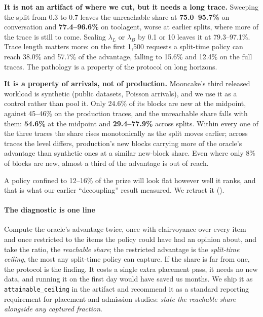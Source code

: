 \medskip
\noindent\textbf{It is not an artifact of where we cut, but it needs a long trace.} Sweeping the split
from 0.3 to 0.7 leaves the unreachable share at \textbf{75.0--95.7\%} on conversation and
\textbf{77.4--96.6\%} on toolagent, worse at earlier splits, where more of the trace is still to come.
Scaling $\lambda_L$ or $\lambda_B$ by 0.1 or 10 leaves it at 79.3--97.1\%. Trace length matters more:
on the first 1{,}500 requests a split-time policy can reach 38.0\% and 57.7\% of the advantage, falling
to 15.6\% and 12.4\% on the full traces. The pathology is a property of the protocol on long horizons.

\medskip
\noindent\textbf{It is a property of arrivals, not of production.} Mooncake's third released workload
is synthetic (public datasets, Poisson arrivals), and we use it as a control rather than pool it.
Only 24.6\% of its blocks are new at the midpoint, against 45--46\% on the production traces, and the
unreachable share falls with them: \textbf{54.6\%} at the midpoint and \textbf{29.4--77.9\%} across
splits. Within every one of the three traces the share rises monotonically as the split moves earlier;
across traces the level differs, production's new blocks carrying more of the oracle's advantage than
synthetic ones at a similar new-block share. Even where only 8\% of blocks are new, almost a third of
the advantage is out of reach.

\medskip
\noindent A policy confined to 12--16\% of the prize will look flat however well it ranks, and that is
what our earlier ``decoupling'' result measured. We retract it ().

\paragraph{The diagnostic is one line} Compute the oracle's advantage twice, once with clairvoyance
over every item and once restricted to the items the policy could have had an opinion about, and take the
ratio, the \emph{reachable share}; the restricted advantage is the \emph{split-time ceiling}, the most
any split-time policy can capture. If the share is far from one, the protocol is the finding. It costs a single extra placement pass, it
needs no new data, and running it on the first day would have saved us months. We ship
it as \texttt{attainable\_ceiling} in the artifact and recommend it as a standard reporting requirement
for placement and admission studies: \emph{state the reachable share alongside any captured fraction}.

